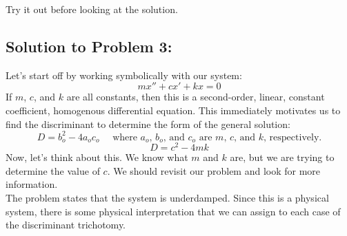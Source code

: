 \documentclass[a4paper,12pt]{article} %
\begin{document}
\begin{center}
\end{center}

Try it out before looking at the solution.

\pagebreak

\subsection*{Solution to Problem 3:}
Let's start off by working symbolically with our system:
$$ mx'' + cx' + kx = 0 $$
If $m$, $c$, and $k$ are all constants, then this is a second-order, linear, constant coefficient, homogenous differential equation. This immediately motivates us to find the discriminant to determine the form of the general solution:
$$ D = b_o^2 - 4a_oc_o \quad\text{ where $a_o$, $b_o$, and $c_o$ are $m$, $c$, and $k$, respectively.} $$
$$ D = c^2 - 4mk $$
Now, let's think about this. We know what $m$ and $k$ are, but we are trying to determine the value of $c$. We should revisit our problem and look for more information.\\

The problem states that the system is underdamped. Since this is a physical system, there is some physical interpretation that we can assign to each case of the discriminant trichotomy.\\
\end{document}
